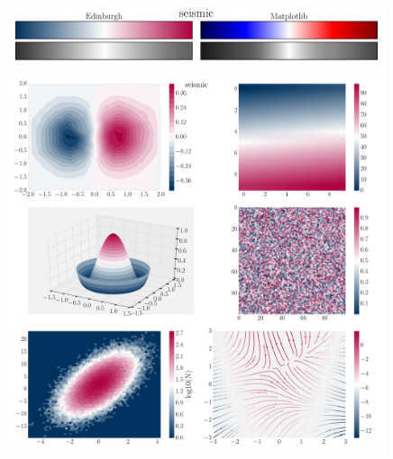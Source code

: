 \documentclass[10pt,a4paper]{article}
\begin{document}
\newpage
\begin{figure}[ht]
  \centering
  \includegraphics[width=0.99\textwidth]{seismicBars.pdf}
  \includegraphics[width=0.99\textwidth]{seismicExamples.pdf}
\end{figure}
\end{document}
